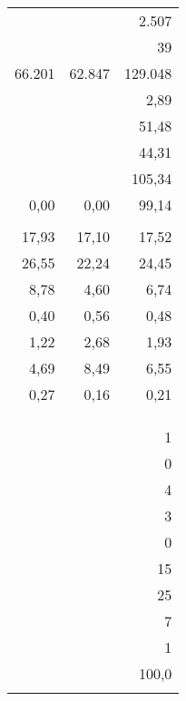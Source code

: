 \begin{tabular}{|r|r|r|}
	               &        &        2.507 \\
	               &        &           39 \\
	        66.201 & 62.847 &      129.048 \\
	               &        &         2,89 \\
	               &        &        51,48 \\
	               &        &        44,31 \\
	               &        &       105,34 \\
	          0,00 &   0,00 &        99,14 \\
	               &        &              \\
	         17,93 &  17,10 &        17,52 \\
	         26,55 &  22,24 &        24,45 \\
	          8,78 &   4,60 &         6,74 \\
	          0,40 &   0,56 &         0,48 \\
	          1,22 &   2,68 &         1,93 \\
	          4,69 &   8,49 &         6,55 \\
	          0,27 &   0,16 &         0,21 \\
	               &        &              \\
	               &        &              \\
	               &        &              \\
	               &        &            1 \\
	               &        &            0 \\
	               &        &            4 \\
	               &        &            3 \\
	               &        &            0 \\
	               &        &           15 \\
	               &        &           25 \\
	               &        &            7 \\
	               &        &            1 \\
	               &        &        100,0 \\
	               &        &              \\

\end{tabular}
